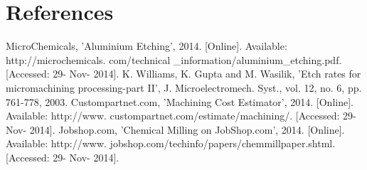 \documentclass[12pt]{article}
\begin{document}
\newpage
\section*{References}

\noindent
[1] MicroChemicals, 'Aluminium Etching', 2014. [Online]. Available: http://microchemicals. com/technical \_information/aluminium\_etching.pdf. [Accessed: 29- Nov- 2014].
\newline
\newline
\noindent
[2]K. Williams, K. Gupta and M. Wasilik, 'Etch rates for micromachining processing-part II', J. Microelectromech. Syst., vol. 12, no. 6, pp. 761-778, 2003.
\newline
\newline
\noindent
[3] Custompartnet.com, 'Machining Cost Estimator', 2014. [Online]. Available: http://www. custompartnet.com/estimate/machining/. [Accessed: 29- Nov- 2014].
\newline
\newline
\noindent
[4] Jobshop.com, 'Chemical Milling on JobShop.com', 2014. [Online]. Available: http://www. jobshop.com/techinfo/papers/chemmillpaper.shtml. [Accessed: 29- Nov- 2014].
\newline
\newline
\noindent
\end{document}
